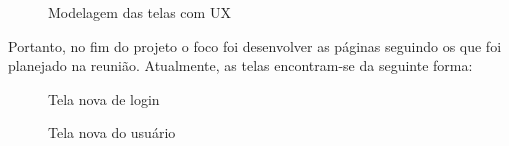 \begin{figure}[H]
  \centering
  \caption{Modelagem das telas com UX}\label{figura:ux}
\end{figure}

Portanto, no fim do projeto o foco foi desenvolver as páginas seguindo os que foi planejado na reunião. Atualmente, as telas encontram-se da seguinte forma:

\begin{figure}[H]
  \centering
  \caption{Tela nova de login}\label{figura:loginNovo}
\end{figure}

\begin{figure}[H]
  \centering
  \caption{Tela nova do usuário}\label{figura:indexNovo}
\end{figure}

